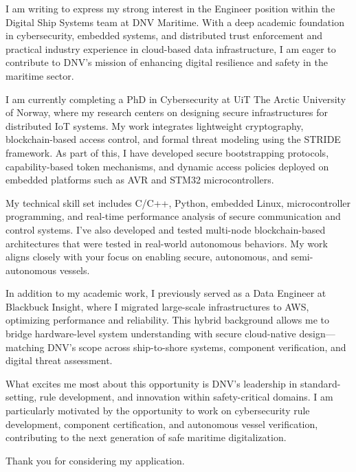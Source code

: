 I am writing to express my strong interest in the Engineer position within the Digital Ship Systems team at DNV Maritime. With a deep academic foundation in cybersecurity, embedded systems, and distributed trust enforcement and practical industry experience in cloud-based data infrastructure, I am eager to contribute to DNV’s mission of enhancing digital resilience and safety in the maritime sector.

I am currently completing a PhD in Cybersecurity at UiT The Arctic University of Norway, where my research centers on designing secure infrastructures for distributed IoT systems. My work integrates lightweight cryptography, blockchain-based access control, and formal threat modeling using the STRIDE framework. As part of this, I have developed secure bootstrapping protocols, capability-based token mechanisms, and dynamic access policies deployed on embedded platforms such as AVR and STM32 microcontrollers.

My technical skill set includes C/C++, Python, embedded Linux, microcontroller programming, and real-time performance analysis of secure communication and control systems. I’ve also developed and tested multi-node blockchain-based architectures that were tested in real-world autonomous behaviors. My work aligns closely with your focus on enabling secure, autonomous, and semi-autonomous vessels.

In addition to my academic work, I previously served as a Data Engineer at Blackbuck Insight, where I migrated large-scale infrastructures to AWS, optimizing performance and reliability. This hybrid background allows me to bridge hardware-level system understanding with secure cloud-native design—matching DNV’s scope across ship-to-shore systems, component verification, and digital threat assessment.

What excites me most about this opportunity is DNV’s leadership in standard-setting, rule development, and innovation within safety-critical domains. I am particularly motivated by the opportunity to work on cybersecurity rule development, component certification, and autonomous vessel verification, contributing to the next generation of safe maritime digitalization.

Thank you for considering my application.